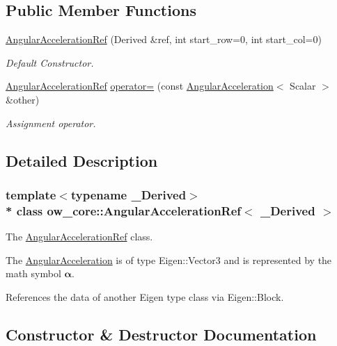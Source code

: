 \subsection*{Public Member Functions}
\begin{DoxyCompactItemize}
\item 
\hyperlink{classow__core_1_1AngularAccelerationRef_ae466617c8ded385605919c2508e8f83c}{Angular\+Acceleration\+Ref} (Derived \&ref, int start\+\_\+row=0, int start\+\_\+col=0)
\begin{DoxyCompactList}\small\item\em Default Constructor. \end{DoxyCompactList}\item 
\hyperlink{classow__core_1_1AngularAccelerationRef}{Angular\+Acceleration\+Ref} \hyperlink{classow__core_1_1AngularAccelerationRef_acd04ba80b5e9aa392cb61d1986396a16}{operator=} (const \hyperlink{classow__core_1_1AngularAcceleration}{Angular\+Acceleration}$<$ Scalar $>$ \&other)\hypertarget{classow__core_1_1AngularAccelerationRef_acd04ba80b5e9aa392cb61d1986396a16}{}\label{classow__core_1_1AngularAccelerationRef_acd04ba80b5e9aa392cb61d1986396a16}

\begin{DoxyCompactList}\small\item\em Assignment operator. \end{DoxyCompactList}\end{DoxyCompactItemize}


\subsection{Detailed Description}
\subsubsection*{template$<$typename \+\_\+\+Derived$>$\\*
class ow\+\_\+core\+::\+Angular\+Acceleration\+Ref$<$ \+\_\+\+Derived $>$}

The \hyperlink{classow__core_1_1AngularAccelerationRef}{Angular\+Acceleration\+Ref} class. 

The \hyperlink{classow__core_1_1AngularAcceleration}{Angular\+Acceleration} is of type Eigen\+::\+Vector3 and is represented by the math symbol $\mathbf{\alpha}$.

References the data of another Eigen type class via Eigen\+::\+Block. 

\subsection{Constructor \& Destructor Documentation}
